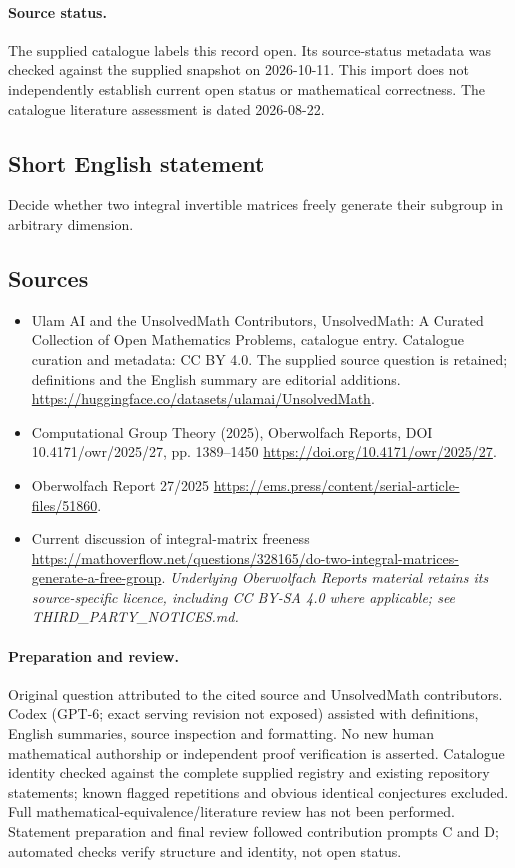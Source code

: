 \documentclass[11pt]{article}
\begin{document}
\paragraph{Source status.}
The supplied catalogue labels this record open. Its source-status metadata was checked against the supplied snapshot on 2026-10-11. This import does not independently establish current open status or mathematical correctness. The catalogue literature assessment is dated 2026-08-22.
\subsection{Short English statement}
Decide whether two integral invertible matrices freely generate their subgroup in arbitrary dimension.
\subsection{Sources}
\begin{itemize}
\item[S1] Ulam AI and the UnsolvedMath Contributors, UnsolvedMath: A Curated Collection of Open Mathematics Problems, catalogue entry. Catalogue curation and metadata: CC BY 4.0. The supplied source question is retained; definitions and the English summary are editorial additions.
\url{https://huggingface.co/datasets/ulamai/UnsolvedMath}.
\item[S2] Computational Group Theory (2025), Oberwolfach Reports, DOI 10.4171/owr/2025/27, pp. 1389--1450
\url{https://doi.org/10.4171/owr/2025/27}.
\item[S3] Oberwolfach Report 27/2025
\url{https://ems.press/content/serial-article-files/51860}.
\item[S4] Current discussion of integral-matrix freeness
\url{https://mathoverflow.net/questions/328165/do-two-integral-matrices-generate-a-free-group}.
\textit{Underlying Oberwolfach Reports material retains its source-specific licence, including CC BY-SA 4.0 where applicable; see THIRD\_PARTY\_NOTICES.md.}
\end{itemize}
\paragraph{Preparation and review.}
Original question attributed to the cited source and UnsolvedMath contributors. Codex (GPT-6; exact serving revision not exposed) assisted with definitions, English summaries, source inspection and formatting. No new human mathematical authorship or independent proof verification is asserted. Catalogue identity checked against the complete supplied registry and existing repository statements; known flagged repetitions and obvious identical conjectures excluded. Full mathematical-equivalence/literature review has not been performed. Statement preparation and final review followed contribution prompts C and D; automated checks verify structure and identity, not open status.
\label{end:statement}
\end{document}
